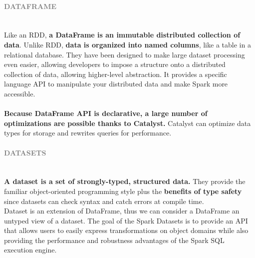 \documentclass[10pt,a4paper]{article}
\newcommand{\nline}{\\~\\}
\newcommand{\myparagraph}[1]{\paragraph{\normalsize{\textcolor{gray}{\uppercase{\textbf{#1}}}} }\mbox{} \vspace{0.5em}\\}
\begin{document}
\myparagraph{DataFrame}
Like an RDD, \textbf{a DataFrame is an immutable distributed collection of data}. Unlike RDD, \textbf{data is organized into named columns}, like a table in a relational database. They have been designed to make large dataset processing even easier, allowing developers to impose a structure onto a distributed collection of data, allowing higher-level abstraction. It provides a specific language API to manipulate your distributed data and make Spark more accessible.
\nline
\textbf{Because DataFrame API is declarative, a large number of optimizations are possible thanks to Catalyst.} Catalyst can optimize data types for storage and rewrites queries for performance.

\myparagraph{Datasets}
\textbf{A dataset is a set of strongly-typed, structured data.} They provide the familiar object-oriented programming style plus the \textbf{benefits of type safety} since datasets can check syntax and catch errors at compile time. \\
Dataset is an extension of DataFrame, thus we can consider a DataFrame an untyped view of a dataset. The goal of the Spark Datasets is to provide an API that allows users to easily express transformations on object domains while also providing the performance and robustness advantages of the Spark SQL execution engine.
\pagebreak
\end{document}

